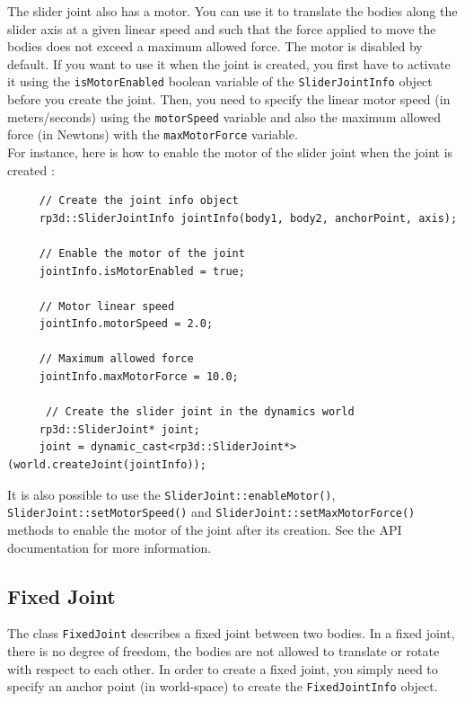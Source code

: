 \documentclass[a4paper,12pt]{article}
\begin{document}
     The slider joint also has a motor. You can use it to translate the bodies along the slider axis at a given linear speed and such that the force applied to
     move the bodies does not exceed a maximum allowed force. The motor is disabled by default. If you want to use it when the joint is created, you first have to activate it using the
     \texttt{isMotorEnabled} boolean variable of the \texttt{SliderJointInfo} object before you create the joint. Then, you need to specify the linear motor speed (in meters/seconds)
     using the \texttt{motorSpeed} variable and also the maximum allowed force (in Newtons) with the \texttt{maxMotorForce} variable. \\

     For instance, here is how to enable the motor of the slider joint when the joint is created : \\

     \begin{lstlisting}
     // Create the joint info object
     rp3d::SliderJointInfo jointInfo(body1, body2, anchorPoint, axis);

     // Enable the motor of the joint
     jointInfo.isMotorEnabled = true;

     // Motor linear speed
     jointInfo.motorSpeed = 2.0;

     // Maximum allowed force
     jointInfo.maxMotorForce = 10.0;

      // Create the slider joint in the dynamics world
     rp3d::SliderJoint* joint;
     joint = dynamic_cast<rp3d::SliderJoint*>(world.createJoint(jointInfo));
  \end{lstlisting}

     \vspace{0.6cm}

     \begin{sloppypar}
        It is also possible to use the \texttt{SliderJoint::enableMotor()}, \texttt{SliderJoint::setMotorSpeed()} and \texttt{SliderJoint::setMaxMotorForce()} methods to enable the
        motor of the joint after its creation. See the API documentation for more information.
     \end{sloppypar}

    \subsection{Fixed Joint}

    The class \texttt{FixedJoint} describes a fixed joint between two bodies. In a fixed joint, there is no degree of freedom, the bodies are not allowed to translate
    or rotate with respect to each other. In order to create a fixed joint, you simply need to specify an anchor point (in world-space) to create the \texttt{FixedJointInfo}
    object. \\
\end{document}
